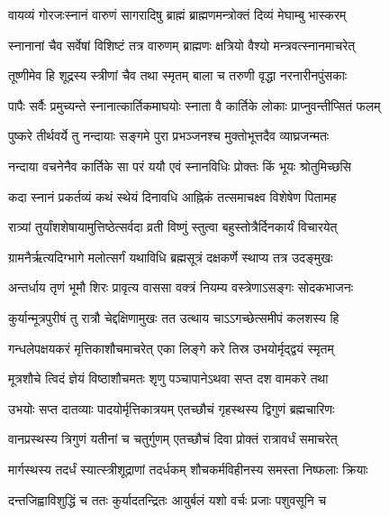 \twolineshloka
{वायव्यं गोरजःस्नानं वारुणं सागरादिषु}
{ब्राह्मं ब्राह्मणमन्त्रोक्तं दिव्यं मेघाम्बु भास्करम्} %

\twolineshloka
{स्नानानां चैव सर्वेषां विशिष्टं तत्र वारुणम्}
{ब्राह्मणः क्षत्रियो वैश्यो मन्त्रवत्स्नानमाचरेत्} %

\twolineshloka
{तूष्णीमेव हि शूद्रस्य स्त्रीणां चैव तथा स्मृतम्}
{बाला च तरुणी वृद्धा नरनारीनपुंसकाः} %

\twolineshloka
{पापैः सर्वैः प्रमुच्यन्ते स्नानात्कार्तिकमाघयोः}
{स्नाता वै कार्तिके लोकाः प्राप्नुवन्तीप्सितं फलम्} %

\twolineshloka
{पुष्करे तीर्थवर्ये तु नन्दायाः सङ्गमे पुरा}
{प्रभञ्जनश्च मुक्तोभूत्तदैव व्याघ्रजन्मतः} %

\twolineshloka
{नन्दाया वचनेनैव कार्तिके सा परं ययौ}
{एवं स्नानविधिः प्रोक्तः किं भूयः श्रोतुमिच्छसि} %





\twolineshloka
{कदा स्नानं प्रकर्तव्यं कथं स्थेयं दिनावधि}
{आह्निकं तत्समाचक्ष्व विशेषेण पितामह} %

\twolineshloka
{रात्र्यां तुर्यांशशेषायामुत्तिष्ठेत्सर्वदा व्रती}
{विष्णुं स्तुत्वा बहुस्तोत्रैर्दिनकार्यं विचारयेत्} %

\twolineshloka
{ग्रामनैर्ऋत्यदिग्भागे मलोत्सर्गं यथाविधि}
{ब्रह्मसूत्रं दक्षकर्णे स्थाप्य तत्र उदङ्मुखः} %

\twolineshloka
{अन्तर्धाय तृणं भूमौ शिरः प्रावृत्य वाससा}
{वक्त्रं नियम्य वस्त्रेणाऽसङ्गः सोदकभाजनः} %

\twolineshloka
{कुर्यान्मूत्रपुरीषं तु रात्रौ चेद्दक्षिणामुखः}
{तत उत्थाय चाऽऽगच्छेत्समीपं कलशस्य हि} %

\twolineshloka
{गन्धलेपक्षयकरं मृत्तिकाशौचमाचरेत्}
{एका लिङ्गे करे तिस्र उभयोर्मृद्द्वयं स्मृतम्} %

\twolineshloka
{मूत्रशौचे त्विदं ज्ञेयं विष्ठाशौचमतः शृणु}
{पञ्चापानेऽथवा सप्त दश वामकरे तथा} %

\twolineshloka
{उभयोः सप्त दातव्याः पादयोर्मृत्तिकात्रयम्}
{एतच्छौचं गृहस्थस्य द्विगुणं ब्रह्मचारिणः} %

\twolineshloka
{वानप्रस्थस्य त्रिगुणं यतीनां च चतुर्गुणम्}
{एतच्छौचं दिवा प्रोक्तं रात्रावर्धं समाचरेत्} %

\twolineshloka
{मार्गस्थस्य तदर्धं स्यात्स्त्रीशूद्राणां तदर्धकम्}
{शौचकर्मविहीनस्य समस्ता निष्फलाः क्रियाः} %

\twolineshloka
{दन्तजिह्वाविशुद्धिं च ततः कुर्यादतन्द्रितः}
{आयुर्बलं यशो वर्चः प्रजाः पशुवसूनि च} %

